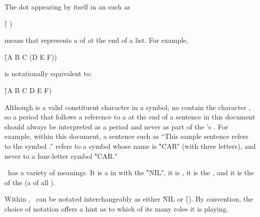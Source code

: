 \endsubsubsubsection%

The dot appearing by itself in an  such as

\f{(  {\dot} )}

means that  represents a  of  
at the end of a list.  For example,

\f{(A B C {\dot} (D E F))}

is notationally equivalent to:

\f{(A B C D E F)}

Although  is a valid constituent character in a symbol, no 
  contain the character ,
so a period that follows a reference to a  at the end of
a sentence in this document should always be interpreted as a period
and never as part of the 's .
For example, within this document, a sentence such as
 ``This sample sentence refers to the symbol .'' 
refers to a symbol whose name is \f{"CAR"} (with three letters),
and never to a four-letter symbol \f{"CAR."}

\endsubsubsubsection%

\nil\ has a variety of meanings.
It is a  in  with the  \f{"NIL"},
it is  ,
it is the ,
and it is the  of the  (a  of all ).

Within \clisp, \nil\ can be notated interchangeably as either \f{NIL} or \f{()}.
By convention, the choice of notation offers a hint as to which of its many
roles it is playing.


